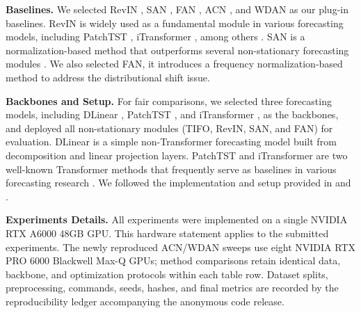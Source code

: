 \documentclass[sigconf,anonymous,review]{acmart}
\newcommand{\resubmitchange}[1]{#1}
\newcommand{\methodn}{\textsc{TIFO}}
\newcommand{\method}{\textsc{\methodn}\xspace}
\begin{document}


\noindent\textbf{Baselines.}
We selected RevIN \citep{kim2021RevIN}, SAN \citep{liu2023SAN},
FAN \citep{ye2024FAN}, ACN \citep{lee2025channel}, and WDAN
\citep{lin2025wdan} as our plug-in baselines.
RevIN is widely used as a fundamental module in various forecasting models, including PatchTST \citep{PatchTST}, iTransformer \citep{liu2023itransformer}, 
among others \citep{wang2024tssurvey}.
SAN is a normalization-based method that outperforms several non-stationary forecasting modules \citep{kim2021RevIN, fan2023dish}.
We also selected FAN, it introduces a frequency normalization-based method to address the distributional shift issue.



\noindent\textbf{Backbones and Setup.}
For fair comparisons, we selected three forecasting models, including DLinear \citep{DLinear}, PatchTST \citep{PatchTST}, and iTransformer \citep{liu2023itransformer}, as the backbones, and deployed all non-stationary modules (\method, RevIN, SAN, and FAN) for evaluation.
DLinear is a simple non-Transformer forecasting model built from decomposition and linear projection layers.
PatchTST and iTransformer are two well-known Transformer methods that frequently serve as baselines in various forecasting research \citep{liu2023itransformer, Liu2024FOIL, Piao2024fredformer, FRNet2024Zhang}.
We followed the implementation and setup provided in \citep{liu2023SAN} and \citep{liu2023itransformer}.



\noindent\textbf{Experiments Details.} 
All experiments were implemented on a single NVIDIA RTX A6000 48GB GPU. 
\resubmitchange{This hardware statement applies to the submitted experiments.
The newly reproduced ACN/WDAN sweeps use eight NVIDIA RTX PRO 6000 Blackwell
Max-Q GPUs; method comparisons retain identical data, backbone, and optimization
protocols within each table row.}
Dataset splits, preprocessing, commands, seeds, hashes, and final metrics are
recorded by the reproducibility ledger accompanying the anonymous code release.
\end{document}
